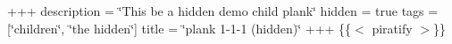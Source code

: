 +++ description = \char`\"{}\+This be a hidden demo child plank\char`\"{} hidden = true tags = \mbox{[}\char`\"{}children\char`\"{}, \char`\"{}the hidden\char`\"{}\mbox{]} title = \char`\"{}plank 1-\/1-\/1 (hidden)\char`\"{} +++ \{\{$<$ piratify $>$\}\} 